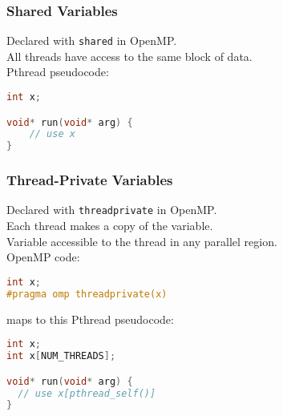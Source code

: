 \documentclass[aspectratio=43]{beamer}
\newenvironment{changemargin}[1]{%
  \begin{list}{}{%
    \setlength{\topsep}{0pt}%
    \setlength{\leftmargin}{#1}%
    \setlength{\rightmargin}{1em}
    \setlength{\listparindent}{\parindent}%
    \setlength{\itemindent}{\parindent}%
    \setlength{\parsep}{\parskip}%
  }%
  \item[]}{\end{list}}
\begin{document}
\begin{frame}[fragile]
  \frametitle{Shared Variables}

  \begin{changemargin}{2cm}
    Declared with {\tt shared}  in OpenMP.\\[1em]
    All threads have access to the same block of data.\\[2em]

    Pthread pseudocode:
  \begin{lstlisting}[language=C]
int x;

void* run(void* arg) {
    // use x
}
  \end{lstlisting}
  \end{changemargin}

\end{frame}

\begin{frame}[fragile]
  \frametitle{Thread-Private Variables}
  \begin{changemargin}{2.5cm}
    Declared with {\tt threadprivate}  in OpenMP.\\[1em]
    Each thread makes a copy of the variable.\\[1em]
    Variable accessible to the thread in any parallel region.\\[2em]

OpenMP code:
  \begin{lstlisting}[language=C]
int x;
#pragma omp threadprivate(x)
  \end{lstlisting}

  maps to this Pthread pseudocode:
  \begin{lstlisting}[language=C]
int x;
int x[NUM_THREADS];

void* run(void* arg) {
  // use x[pthread_self()]
}
  \end{lstlisting}
  \end{changemargin}

\end{frame}
\end{document}
